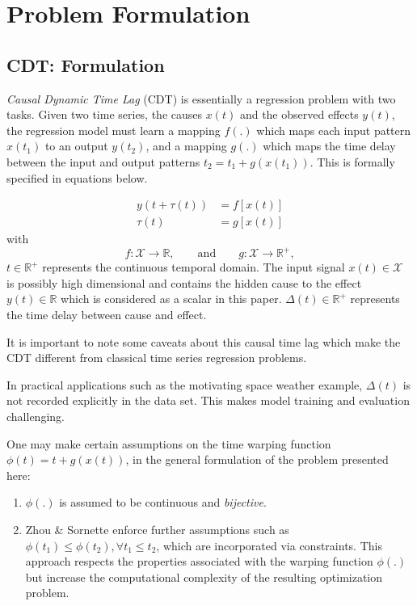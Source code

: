\documentclass[runningheads]{llncs}
\begin{document}
\section{Problem Formulation}\label{sec:formulation}

\subsection{CDT: Formulation}

\emph{Causal Dynamic Time Lag} (CDT) is essentially a regression problem with two tasks. 
Given two time series, the causes $x(t)$ and the observed effects $y(t)$, the regression model 
must learn a mapping $f(.)$ which maps each input pattern $x(t_1)$ to an output $y(t_2)$, and a 
mapping $g(.)$ which maps the time delay between the input and output patterns $t_2 = t_1 + g(x(t_1))$. 
This is formally specified in equations below.

\begin{align}
y(t + \tau(t)) & = f[x(t)]\label{eq:pb1}\\
\tau(t) & = g[x(t)]\label{eq:pb2} 
\end{align}
with
\[
f: \mathcal{X}  \rightarrow \mathbb{R},\qquad\text{and}\qquad
g: \mathcal{X}  \rightarrow \mathbb{R}^{+},
\]
$t \in \mathbb{R}^{+}$ represents the continuous temporal domain. The input signal 
$x(t)\in \mathcal{X}$ is possibly high dimensional and contains the hidden cause to 
the effect $y(t)\in\mathbb{R}$ which is considered as a scalar in this paper. 
$\Delta(t)\in \mathbb{R}^+$ represents the time delay between cause and effect.

It is important to note some caveats about this causal time lag which make the CDT different from 
classical time series regression problems.

In practical applications such as the motivating space weather example, $\Delta(t)$ is not recorded 
explicitly in the data set. This makes model training and evaluation challenging.

One may make certain assumptions on the time warping function $\phi(t) = t + g(x(t))$, in the general 
formulation of the problem presented here: 

\begin{enumerate}
    \item $\phi(.)$ is assumed to be continuous and \emph{bijective}.
    \item Zhou \& Sornette \cite{ZHOU2006195} enforce further assumptions such as 
          $\phi(t_1) \leq \phi(t_2), \forall t_1 \leq t_2$, which are incorporated via constraints. 
          This approach respects the properties associated with the warping function $\phi(.)$ but 
          increase the computational complexity of the resulting optimization problem.
\end{enumerate}
\end{document}
